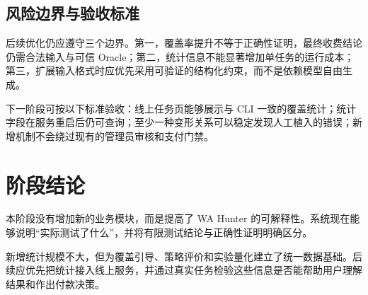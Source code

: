 \documentclass[10pt,a4paper]{ctexart}
\begin{document}
\subsection{风险边界与验收标准}

后续优化仍应遵守三个边界。第一，覆盖率提升不等于正确性证明，最终收费结论仍需合法输入与可信 Oracle；第二，统计信息不能显著增加单任务的运行成本；第三，扩展输入格式时应优先采用可验证的结构化约束，而不是依赖模型自由生成。

下一阶段可按以下标准验收：线上任务页能够展示与 CLI 一致的覆盖统计；统计字段在服务重启后仍可查询；至少一种变形关系可以稳定发现人工植入的错误；新增机制不会绕过现有的管理员审核和支付门禁。

\section{阶段结论}

本阶段没有增加新的业务模块，而是提高了 WA Hunter 的可解释性。系统现在能够说明“实际测试了什么”，并将有限测试结论与正确性证明明确区分。

新增统计规模不大，但为覆盖引导、策略评价和实验量化建立了统一数据基础。后续应优先把统计接入线上服务，并通过真实任务检验这些信息是否能帮助用户理解结果和作出付款决策。
\end{document}
